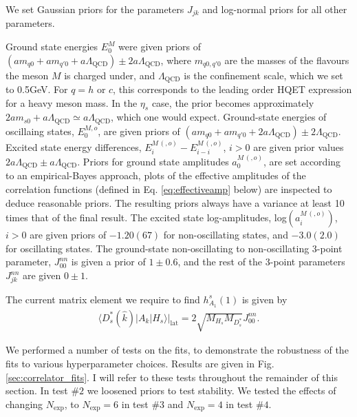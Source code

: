 We set Gaussian priors for the parameters $J_{jk}$ and log-normal priors for all other parameters.

Ground state energies $E_0^M$ were given priors of $(am_{q0} + am_{q'0} + a\Lambda_{\text{QCD}} )\pm 2a\Lambda_{\text{QCD}}$, where $m_{q0,q'0}$ are the masses of the flavours the meson $M$ is charged under, and $\Lambda_{\text{QCD}}$ is the confinement scale, which we set to 0.5GeV. For $q=h$ or $c$, this corresponds to the leading order HQET expression for a heavy meson mass. In the $\eta_s$ case, the prior becomes approximately $2am_{s0} + a\Lambda_{\text{QCD}} \simeq a\Lambda_{\text{QCD}}$, which one would expect. Ground-state energies of oscillaing states, $E_0^{M,o}$, are given priors of $(am_{q0} + am_{q'0} + 2 a\Lambda_{\text{QCD}})\pm 2\Lambda_{\text{QCD}}$. Excited state energy differences, $E_i^{M\,(,o)}-E_{i-i}^{M\,(,o)}$, $i>0$ are given prior values $2a\Lambda_{\text{QCD}}\pm a\Lambda_{\text{QCD}}$. Priors for ground state amplitudes $a_0^{M\,(,o)}$, are set according to an empirical-Bayes approach, plots of the effective amplitudes of the correlation functions (defined in Eq. \ref{eq:effectiveamp} below) are inspected to deduce reasonable priors. The resulting priors always have a variance at least 10 times that of the final result. The excited state log-amplitudes, log$(a_i^{M\,(,o)})$,$i>0$ are given priors of $-1.20(67)$ for non-oscillating states, and $-3.0(2.0)$ for oscillating states. The ground-state non-oscillating to non-oscillating 3-point parameter, $J_{00}^{nn}$ is given a prior of $1\pm 0.6$, and the rest of the 3-point parameters $J_{jk}^{nn}$ are given $0\pm 1$.

The current matrix element we require to find $h_{A_1}^s(1)$ is given by
\begin{align}
  \langle D_s^*(\hat{k}) | A_k | H_s \rangle |_{\text{lat}} = 2 \sqrt{M_{H_s}M_{D_s^*}} J^{nn}_{00}.
  \label{eq:currentfit}
\end{align}

We performed a number of tests on the fits, to demonstrate the robustness of the fits to various hyperparameter choices. Results are given in Fig. \ref{sec:correlator_fits}. I will refer to these tests throughout the remainder of this section. In test $\#2$ we loosened priors to test stability. We tested the effects of changing $N_{\text{exp}}$, to $N_{\text{exp}}=6$ in test $\#3$ and $N_{\text{exp}}=4$ in test $\#4$.

